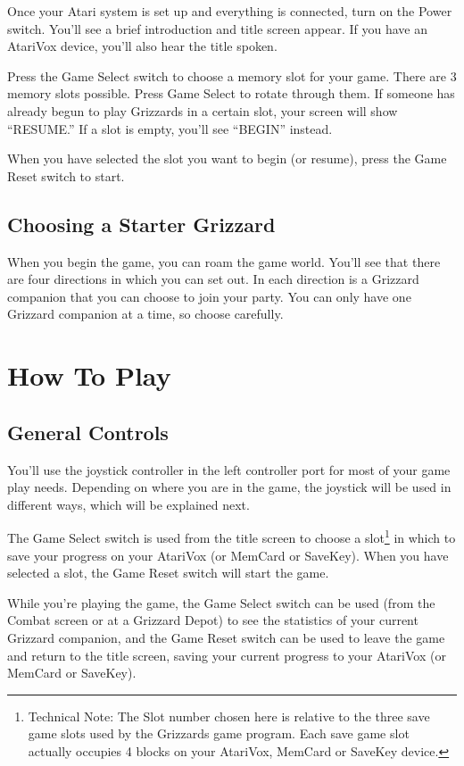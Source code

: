 \documentclass[12pt,twoside,openright,book]{memoir}
\begin{document}
Once your  Atari system is set  up and everything is  connected, turn on
the  Power switch.  You'll see  a  brief introduction  and title  screen
appear.  If  you   have  an  AtariVox  device,  you'll   also  hear  the
title spoken.

Press the  Game Select  switch to  choose a memory  slot for  your game.
There are 3  memory slots possible. Press Game Select  to rotate through
them. If someone has already begun  to play Grizzards in a certain slot,
your  screen will  show  ``RESUME.''  If a  slot  is  empty, you'll  see
``BEGIN'' instead.

When you have selected the slot you want to begin (or resume), press the
Game Reset switch to start.

\section{Choosing a Starter Grizzard}

When you begin  the game, you can  roam the game world.  You'll see that
there are four directions in which you can set out. In each direction is
a Grizzard  companion that you  can choose to  join your party.  You can
only have one Grizzard companion at a time, so choose carefully.

\chapter{How To Play}

\section{General Controls}

You'll use the joystick controller in the left controller port for most of
your game play needs. Depending on where you are in the game, the joystick
will be used in different ways, which will be explained next.

The  Game  Select  switch  is  used from  the  title  screen  to  choose
a slot\footnote{Technical Note: The Slot  number chosen here is relative
  to  the three  save game  slots used  by the  Grizzards game  program.
  Each  save game  slot actually  occupies  4 blocks  on your  AtariVox,
  MemCard or  SaveKey device.} in  which to  save your progress  on your
AtariVox (or  MemCard or SaveKey).  When you  have selected a  slot, the
Game Reset switch will start the game.

While you're playing the game, the Game Select switch can be used (from the
Combat screen or at a Grizzard Depot) to see the statistics of your current
Grizzard companion, and the Game Reset switch can be used to leave the game
and return to the title screen, saving your current progress to your
AtariVox (or MemCard or SaveKey).
\end{document}
